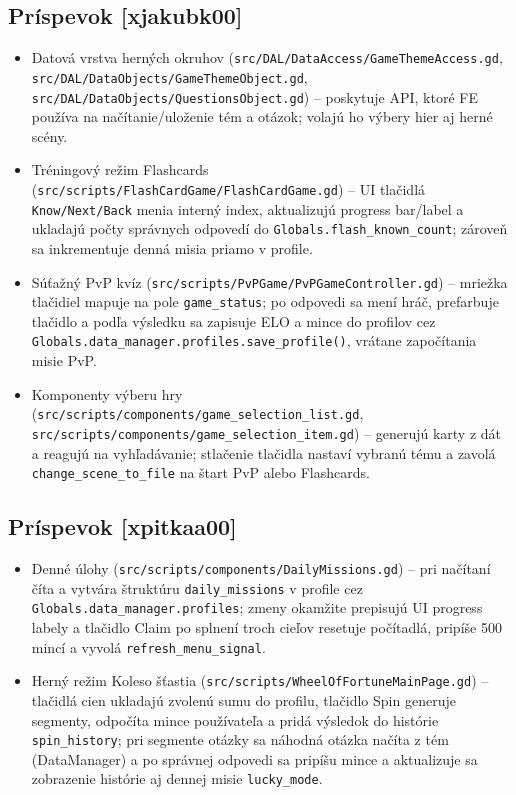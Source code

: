 \documentclass[a4paper,12pt]{article}
\begin{document}
\subsection{Príspevok [xjakubk00]}
\begin{itemize}
	\item Datová vrstva herných okruhov (\texttt{src/DAL/DataAccess/GameThemeAccess.gd}, \texttt{src/DAL/DataObjects/GameThemeObject.gd}, \texttt{src/DAL/DataObjects/QuestionsObject.gd}) – poskytuje API, ktoré FE používa na načítanie/uloženie tém a otázok; volajú ho výbery hier aj herné scény.
	\item Tréningový režim Flashcards (\texttt{src/scripts/FlashCardGame/FlashCardGame.gd}) – UI tlačidlá \texttt{Know/Next/Back} menia interný index, aktualizujú progress bar/label a ukladajú počty správnych odpovedí do \texttt{Globals.flash\_known\_count}; zároveň sa inkrementuje denná misia priamo v profile.
	\item Súťažný PvP kvíz (\texttt{src/scripts/PvPGame/PvPGameController.gd}) – mriežka tlačidiel mapuje na pole \texttt{game\_status}; po odpovedi sa mení hráč, prefarbuje tlačidlo a podľa výsledku sa zapisuje ELO a mince do profilov cez \texttt{Globals.data\_manager.profiles.save\_profile()}, vrátane započítania misie PvP.
	\item Komponenty výberu hry (\texttt{src/scripts/components/game\_selection\_list.gd}, \texttt{src/scripts/components/game\_selection\_item.gd}) – generujú karty z dát a reagujú na vyhľadávanie; stlačenie tlačidla nastaví vybranú tému a zavolá \texttt{change\_scene\_to\_file} na štart PvP alebo Flashcards.
\end{itemize}

\subsection{Príspevok [xpitkaa00]}
\begin{itemize}
	\item Denné úlohy (\texttt{src/scripts/components/DailyMissions.gd}) – pri načítaní číta a vytvára štruktúru \texttt{daily\_missions} v profile cez \texttt{Globals.data\_manager.profiles}; zmeny okamžite prepisujú UI progress labely a tlačidlo Claim po splnení troch cieľov resetuje počítadlá, pripíše 500 mincí a vyvolá \texttt{refresh\_menu\_signal}.
	\item Herný režim Koleso šťastia (\texttt{src/scripts/WheelOfFortuneMainPage.gd}) – tlačidlá cien ukladajú zvolenú sumu do profilu, tlačidlo Spin generuje segmenty, odpočíta mince používateľa a pridá výsledok do histórie \texttt{spin\_history}; pri segmente otázky sa náhodná otázka načíta z tém (DataManager) a po správnej odpovedi sa pripíšu mince a aktualizuje sa zobrazenie histórie aj dennej misie \texttt{lucky\_mode}.
\end{itemize}

    
\end{document}

